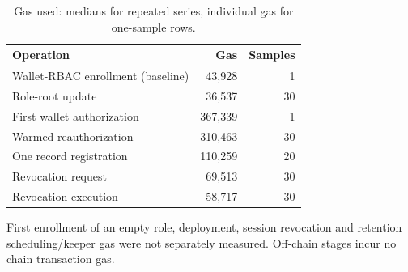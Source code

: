 \begin{table}[t]
\centering\scriptsize
\caption{Gas used: medians for repeated series, individual gas for one-sample rows.}
\label{tab:gas}
\setlength{\tabcolsep}{3pt}\renewcommand{\arraystretch}{1.1}
\begin{tabularx}{\columnwidth}{>{\raggedright\arraybackslash}Xrr}
\toprule Operation & Gas & Samples\\\midrule
Wallet-RBAC enrollment (baseline) & 43,928 & 1\\
Role-root update & 36,537 & 30\\
First wallet authorization & 367,339 & 1\\
Warmed reauthorization & 310,463 & 30\\
One record registration & 110,259 & 20\\
Revocation request & 69,513 & 30\\
Revocation execution & 58,717 & 30\\
\bottomrule\end{tabularx}
\par\smallskip\raggedright First enrollment of an empty role, deployment, session revocation and retention scheduling/keeper gas were not separately measured. Off-chain stages incur no chain transaction gas.
\end{table}
